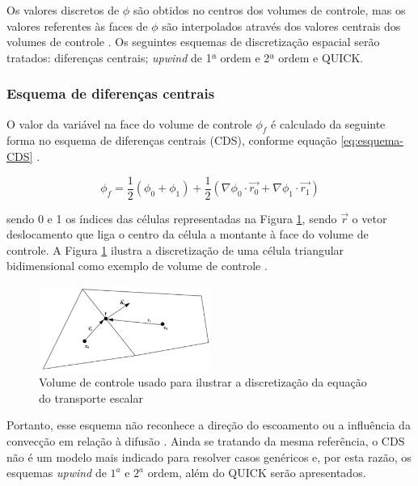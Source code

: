 Os valores discretos de $\phi$ são obtidos no centros dos volumes de controle, mas os valores referentes às faces de $\phi$ são interpolados através dos valores centrais dos volumes de controle \cite{Rezende2009}. Os seguintes esquemas de discretização espacial serão tratados: diferenças centrais; \textit{upwind} de 1ª ordem e 2ª ordem e QUICK.

\subsubsection{Esquema de diferenças centrais}

O valor da variável na face do volume de controle $\phi_{f}$ é calculado da seguinte forma no esquema de diferenças centrais (CDS), conforme equação \ref{eq:esquema-CDS} \cite{Rezende2009}.

\begin{equation}
    \label{eq:esquema-CDS}
    \phi_f = \frac{1}{2}\left(\phi_0+\phi_1\right)+\frac{1}{2}\left(\nabla\phi_0\cdot\overrightarrow{r_0}+\nabla\phi_1\cdot\overrightarrow{r_1}\right)
\end{equation}

sendo 0 e 1 os índices das células representadas na Figura \ref{fig:volume-ANSYS-2021R2}, sendo $\overrightarrow{r}$ o vetor deslocamento que liga o centro da célula a montante à face do volume de controle. A Figura \ref{fig:volume-ANSYS-2021R2} ilustra a discretização de uma célula triangular bidimensional como exemplo de volume de controle \cite{fluent2021ansys}.

\begin{figure}[!ht] 
	\centering
	\includegraphics[width=0.5\textwidth]{foto01-volume-fluent.png}
    \caption{Volume de controle usado para ilustrar a discretização da equação do transporte escalar \cite{fluent2021ansys}}
	\label{fig:volume-ANSYS-2021R2}
\end{figure}

Portanto, esse esquema não reconhece a direção do escoamento ou a influência da convecção em relação à difusão \cite{malalasekera2007}. Ainda se tratando da mesma referência, o CDS não é um modelo mais indicado para resolver casos genéricos e, por esta razão, os esquemas \textit{upwind} de $1^{a}$ e $2^{a}$ ordem, além do QUICK serão apresentados.

